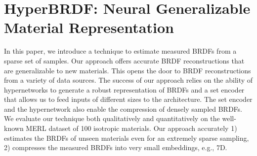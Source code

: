 \chapter{HyperBRDF: Neural Generalizable Material Representation}
\label{ch:HyperBRDF}
In this paper, we introduce a technique to estimate measured BRDFs from a sparse set of samples. Our approach offers accurate BRDF reconstructions that are generalizable to new materials. This opens the door to BRDF reconstructions from a variety of data sources. The success of our approach relies on the ability of hypernetworks to generate a robust representation of BRDFs and a set encoder that allows us to feed inputs of different sizes to the architecture. The set encoder and the hypernetwork also enable the compression of densely sampled BRDFs. We evaluate our technique both qualitatively and quantitatively on the well-known MERL dataset of 100 isotropic materials. Our approach accurately 1) estimates the BRDFs of unseen materials even for an extremely sparse sampling, 2) compresses the measured BRDFs into very small embeddings, e.g., 7D.









